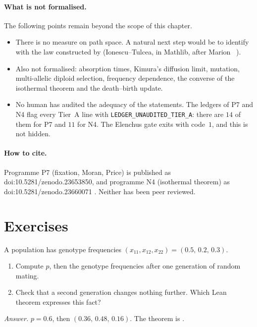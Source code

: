 \paragraph{What is not formalised.} The following points remain beyond the scope of this chapter.
\begin{itemize}[itemsep=1pt]
\item There is no measure on path space. A natural next step would be to identify 
with the law constructed by  (Ionescu--Tulcea, in Mathlib, after Marion
\tierL{}~\cite{ch4:Mar}).
\item Also not formalised: absorption times, Kimura's diffusion limit, mutation,
multi-allelic diploid selection, frequency dependence, the converse of the isothermal theorem and the
death--birth update.
\item No human has audited the adequacy of the statements. The ledgers of P7 and N4 flag
every Tier~A line with \texttt{LEDGER\_UNAUDITED\_TIER\_A}: there are $14$ of them for P7 and $11$
for N4. The Elenchus gate exits with code~$1$, and this is not hidden.
\end{itemize}

\paragraph{How to cite.} Programme P7 (fixation, Moran, Price) is published as doi:10.5281/zenodo.23653850, and
programme N4 (isothermal theorem) as doi:10.5281/zenodo.23660071 \cite{ch4:P7,ch4:N4}. Neither has been
peer reviewed.

\section{Exercises}\label{ch4:sec:exercices}

\begin{exercise}\label{ch4:ex:hw}
A population has genotype frequencies $(x_{11},x_{12},x_{22})=(0.5,\,0.2,\,0.3)$.
\begin{enumerate}[label=\alph*),itemsep=0pt]
\item Compute $p$, then the genotype frequencies after one generation of random mating.
\item Check that a second generation changes nothing further. Which Lean theorem expresses this fact?
\end{enumerate}
\emph{Answer.} $p=0.6$, then $(0.36,\,0.48,\,0.16)$. The theorem is .
\end{exercise}


